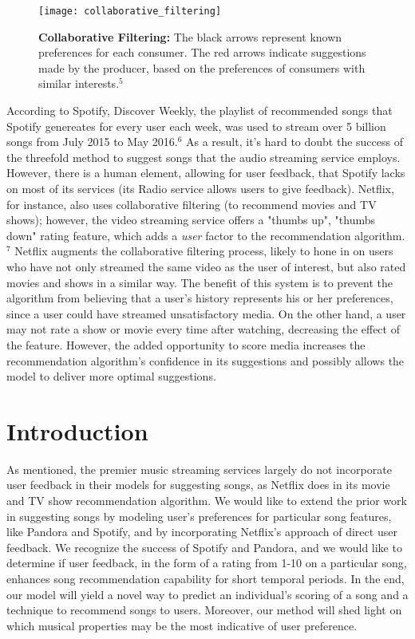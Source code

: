 \documentclass{amsart}
\theoremstyle{plain}
\theoremstyle{definition}
\begin{document}
   	\begin{figure}[h]
   		\centering
   		\texttt{[image: collaborative\_filtering]}
   		\caption{\textbf{Collaborative Filtering: }The black arrows represent known preferences for each consumer. The red arrows indicate suggestions made by the producer, based on the preferences of consumers with similar interests.$^{5}$}
   		\label{fig:collaborative_filtering}
   	\end{figure}
   	
   	According to Spotify, Discover Weekly, the playlist of recommended songs that Spotify genereates for every user each week, was used to stream over 5 billion songs from July 2015 to May 2016.$^{6}$ As a result, it's hard to doubt the success of the threefold method to suggest songs that the audio streaming service employs. However, there is a human element, allowing for user feedback, that Spotify lacks on most of its services (its Radio service allows users to give feedback). Netflix, for instance, also uses collaborative filtering (to recommend movies and TV shows); however, the video streaming service offers a "thumbs up", "thumbs down" rating feature, which adds a \textit{user} factor to the recommendation algorithm.$^{7}$ Netflix augments the collaborative filtering process, likely to hone in on users who have not only streamed the same video as the user of interest, but also rated movies and shows in a similar way. The benefit of this system is to prevent the algorithm from believing that a user's history represents his or her preferences, since a user could have streamed unsatisfactory media. On the other hand, a user may not rate a show or movie every time after watching, decreasing the effect of the feature. However, the added opportunity to score media increases the recommendation algorithm's confidence in its suggestions and possibly allows the model to deliver more optimal suggestions.
   	
   	\section{Introduction}
   	
   	As mentioned, the premier music streaming services largely do not incorporate user feedback in their models for suggesting songs, as Netflix does in its movie and TV show recommendation algorithm. We would like to extend the prior work in suggesting songs by modeling user's preferences for particular song features, like Pandora and Spotify, and by incorporating Netflix's approach of direct user feedback. We recognize the success of Spotify and Pandora, and we would like to determine if user feedback, in the form of a rating from 1-10 on a particular song, enhances song recommendation capability for short temporal periods. In the end, our model will yield a novel way to predict an individual's scoring of a song and a technique to recommend songs to users. Moreover, our method will shed light on which musical properties may be the most indicative of user preference. 
   	
\end{document}

